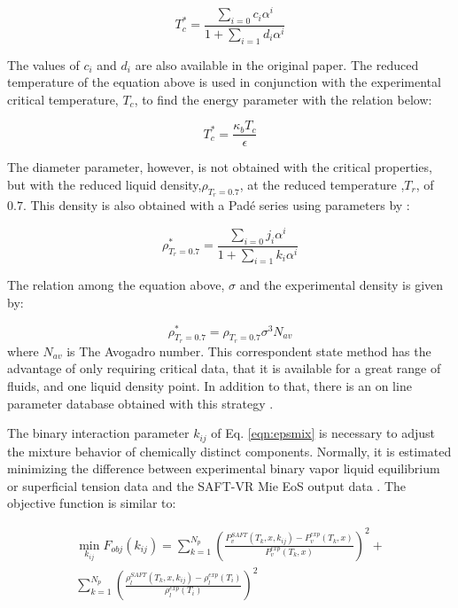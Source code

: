 \begin{equation}
T_{c}^{*} = \frac{\sum_{i=0} c_{i}\alpha^{i}}{1+\sum_{i=1} d_{i}\alpha^{i}}   
\label{eqn:tc}
\end{equation}

The values of $c_{i}$ and $d_{i}$ are also available in the original paper. The reduced temperature of the equation above is used in conjunction with the experimental critical temperature, $ T_{c}$, to find the energy parameter with the relation below:

\begin{equation}
T_{c}^{*} = \frac{\kappa_{b}T_{c}}{\epsilon}   
\label{eqn:epscorre}
\end{equation}

The diameter parameter, however, is not obtained with the critical properties, but with the reduced liquid density,$\rho_{T_{r}=0.7}$, at the reduced temperature ,$T_{r}$, of $0.7$. This density is also obtained with a Padé series using parameters by :

\begin{equation}
\rho_{T_{r}=0.7}^{*} = \frac{\sum_{i=0} j_{i}\alpha^{i}}{1+\sum_{i=1} k_{i}\alpha^{i}} 
\label{eqn:denscorre}
\end{equation}

The relation among the equation above, $\sigma$ and the experimental density is given by:

\begin{equation}
\rho_{T_{r}=0.7}^{*} = \rho_{T_{r}=0.7}\sigma^{3}N_{av}   
\label{eqn:sigmacorre}
\end{equation}
where $N_{av}$ is The Avogadro number. This correspondent state method has the advantage of only requiring critical data, that it is available for a great range of fluids, and one liquid density point. In addition to that, there is an on line parameter database obtained with this strategy \cite{ervik2016}.     

The binary interaction parameter $k_{ij}$ of Eq. \eqref{eqn:epsmix} is necessary to adjust the mixture behavior of chemically distinct components. Normally, it is estimated minimizing the difference between experimental binary vapor liquid equilibrium or superficial tension data and the SAFT-VR Mie EoS output data \cite{muller2017,lobanova2016}. The objective function is similar to: 

\begin{equation}
\begin{aligned}
\min\limits_{k_{ij}} F_{obj}(k_{ij})= \sum_{k=1}^{N_{p}} \left(\frac{P_{v}^{SAFT}(T_{k},x,k_{ij})-P_{v}^{exp}(T_{k},x)}{P_{v}^{exp}(T_{k},x)} \right)^2 +\\
 \sum_{k=1}^{N_{p}} \left(\frac{\rho_{l}^{SAFT}(T_{k},x,k_{ij})-\rho_{l}^{exp}(T_{i})}{\rho_{l}^{exp}(T_{i})} \right)^2
\end{aligned}
\label{eqn:fobjmix}
\end{equation}


